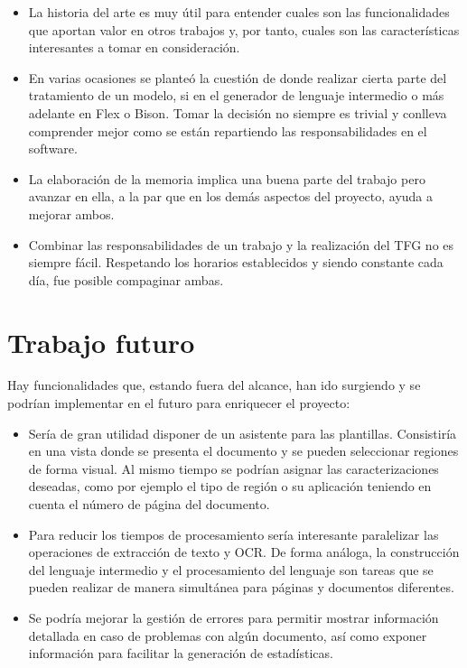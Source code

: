 \begin{itemize}
	\item La historia del arte es muy útil para entender cuales son las funcionalidades que aportan valor en otros trabajos y, por tanto, cuales son las características interesantes a tomar en consideración.
	\item En varias ocasiones se planteó la cuestión de donde realizar cierta parte del tratamiento de un modelo, si en el generador de lenguaje intermedio o más adelante en Flex o Bison. Tomar la decisión no siempre es trivial y conlleva comprender mejor como se están repartiendo las responsabilidades en el software.
	\item La elaboración de la memoria implica una buena parte del trabajo pero avanzar en ella, a la par que en los demás aspectos del proyecto, ayuda a mejorar ambos.
	\item Combinar las responsabilidades de un trabajo y la realización del TFG no es siempre fácil. Respetando los horarios establecidos y siendo constante cada día, fue posible compaginar ambas.
\end{itemize}

\section{Trabajo futuro}

Hay funcionalidades que, estando fuera del alcance, han ido surgiendo y se podrían implementar en el futuro para enriquecer el proyecto:

\begin{itemize}
	\item Sería de gran utilidad disponer de un asistente para las plantillas. Consistiría en una vista donde se presenta el documento y se pueden seleccionar regiones de forma visual. Al mismo tiempo se podrían asignar las caracterizaciones deseadas, como por ejemplo el tipo de región o su aplicación teniendo en cuenta el número de página del documento.
	\item Para reducir los tiempos de procesamiento sería interesante paralelizar las operaciones de extracción de texto y OCR. De forma análoga, la construcción del lenguaje intermedio y el procesamiento del lenguaje son tareas que se pueden realizar de manera simultánea para páginas y documentos diferentes.
	\item Se podría mejorar la gestión de errores para permitir mostrar información detallada en caso de problemas con algún documento, así como exponer información para facilitar la generación de estadísticas.
\end{itemize}
